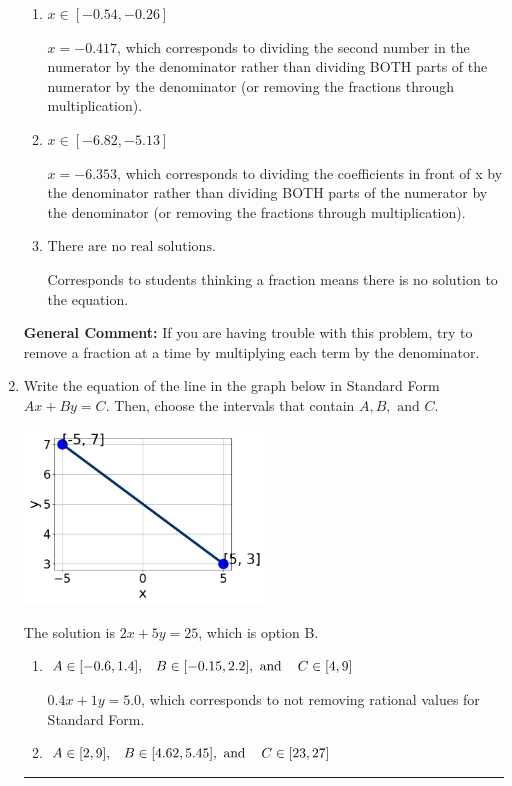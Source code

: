 \documentclass{extbook}[14pt]
\newcommand{\litem}[1]{\item #1

\rule{\textwidth}{0.4pt}}
\begin{document}
\begin{enumerate}
{\begin{enumerate}[label=\Alph*.]
* $x = -1.471$, which is the correct option.
\item \( x \in [-0.54, -0.26] \)

 $x = -0.417$, which corresponds to dividing the second number in the numerator by the denominator rather than dividing BOTH parts of the numerator by the denominator (or removing the fractions through multiplication).
\item \( x \in [-6.82, -5.13] \)

 $x = -6.353$, which corresponds to dividing the coefficients in front of x by the denominator rather than dividing BOTH parts of the numerator by the denominator (or removing the fractions through multiplication).
\item \( \text{There are no real solutions.} \)

Corresponds to students thinking a fraction means there is no solution to the equation.
\end{enumerate}

\textbf{General Comment:} If you are having trouble with this problem, try to remove a fraction at a time by multiplying each term by the denominator.
}
\litem{
Write the equation of the line in the graph below in Standard Form $Ax+By=C$. Then, choose the intervals that contain $A, B, \text{ and } C$.

\begin{center}
    \includegraphics[width=0.5\textwidth]{../Figures/linearGraphToStandardA.png}
\end{center}


The solution is \( 2x + 5y = 25 \), which is option B.\begin{enumerate}[label=\Alph*.]
\item \( A \in [-0.6, 1.4], \hspace{3mm} B \in [-0.15, 2.2], \text{ and } \hspace{3mm} C \in [4, 9] \)

 $0.4x + 1y = 5.0$, which corresponds to not removing rational values for Standard Form.
\item \( A \in [2, 9], \hspace{3mm} B \in [4.62, 5.45], \text{ and } \hspace{3mm} C \in [23, 27] \)


\end{enumerate}}
\end{enumerate}
\end{document}
